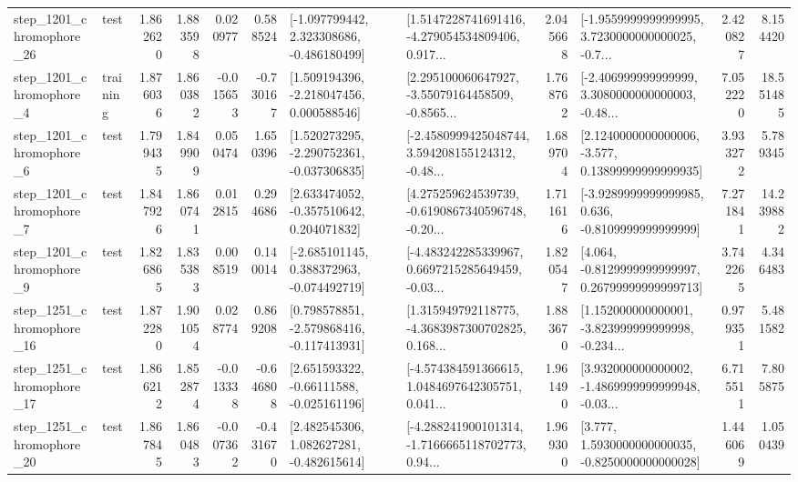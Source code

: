 \begin{tabular}{llrrrrllrlrr}
 step\_1201\_chromophore\_26 &      test &      1.862620 &    1.883598 &      0.020977 &  0.588524 &   [-1.097799442, 2.323308686, -0.486180499] &  [1.5147228741691416, -4.279054534809406, 0.917... &       2.045668 &  [-1.9559999999999995, 3.7230000000000025, -0.7... &            2.420827 &          8.154420 \\
  step\_1201\_chromophore\_4 &  training &      1.876036 &    1.860382 &     -0.015653 & -0.730167 &    [1.509194396, -2.218047456, 0.000588546] &  [2.295100060647927, -3.55079164458509, -0.8565... &       1.768762 &  [-2.406999999999999, 3.3080000000000003, -0.48... &            7.052220 &         18.551485 \\
  step\_1201\_chromophore\_6 &      test &      1.799435 &    1.849909 &      0.050474 &  1.650396 &   [1.520273295, -2.290752361, -0.037306835] &  [-2.4580999425048744, 3.594208155124312, -0.48... &       1.689704 &  [2.1240000000000006, -3.577, 0.13899999999999935] &            3.933272 &          5.789345 \\
  step\_1201\_chromophore\_7 &      test &      1.847926 &    1.860741 &      0.012815 &  0.294686 &    [2.633474052, -0.357510642, 0.204071832] &  [4.275259624539739, -0.6190867340596748, -0.20... &       1.711616 &  [-3.9289999999999985, 0.636, -0.8109999999999999] &            7.271841 &         14.239882 \\
  step\_1201\_chromophore\_9 &      test &      1.826865 &    1.835383 &      0.008519 &  0.140014 &   [-2.685101145, 0.388372963, -0.074492719] &  [-4.483242285339967, 0.6697215285649459, -0.03... &       1.820547 &  [4.064, -0.8129999999999997, 0.26799999999999713] &            3.742265 &          4.346483 \\
 step\_1251\_chromophore\_16 &      test &      1.872280 &    1.901054 &      0.028774 &  0.869208 &   [0.798578851, -2.579868416, -0.117413931] &  [1.315949792118775, -4.3683987300702825, 0.168... &       1.883670 &  [1.152000000000001, -3.823999999999998, -0.234... &            0.979351 &          5.481582 \\
 step\_1251\_chromophore\_17 &      test &      1.866212 &    1.852874 &     -0.013338 & -0.646808 &    [2.651593322, -0.66111588, -0.025161196] &  [-4.574384591366615, 1.0484697642305751, 0.041... &       1.961490 &  [3.932000000000002, -1.4869999999999948, -0.03... &            6.715511 &          7.805875 \\
 step\_1251\_chromophore\_20 &      test &      1.867845 &    1.860483 &     -0.007362 & -0.431670 &    [2.482545306, 1.082627281, -0.482615614] &  [-4.288241900101314, -1.7166665118702773, 0.94... &       1.969300 &   [3.777, 1.5930000000000035, -0.8250000000000028] &            1.446069 &          1.050439 \\

\end{tabular}
